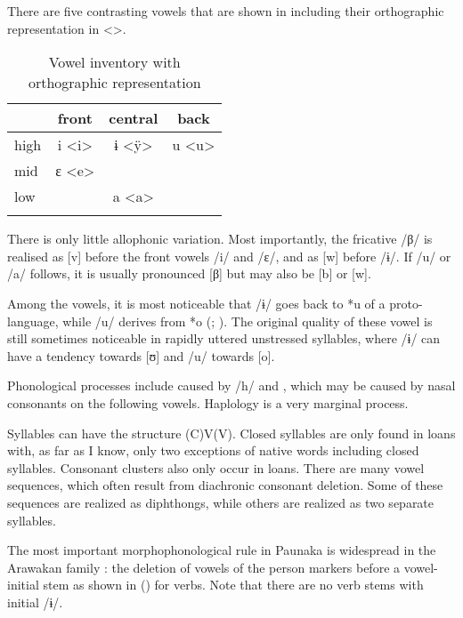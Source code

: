 There are five contrasting vowels that are shown in  including their orthographic representation in <>.

\begin{table}[htbp]
\caption{Vowel inventory with orthographic representation}

\begin{tabular}{lccc}
\lsptoprule
 & front & central & back \\
\midrule high & i <i> & ɨ <ÿ> & u <u> \\
 mid & ɛ <e> & & \\
 low & & a <a> & \\
\lspbottomrule
\end{tabular}

\label{table:O_vowels}
\end{table}%

There is only little allophonic variation. Most importantly, the fricative /β/ is realised as [v] before the front vowels /i/ and /ɛ/, and as [w] before /ɨ/. If /u/ or /a/ follows, it is usually pronounced [β] but may also be [b] or [w].

Among the vowels, it is most noticeable that /ɨ/ goes back to *u of a proto-language, while /u/ derives from *o (\citealt[]{deCarvalhoPAU}; \citealp[]{RamirezFranca2019}). The original quality of these vowel is still sometimes noticeable in rapidly uttered unstressed syllables, where /ɨ/ can have a tendency towards [ʊ] and /u/ towards [o].

Phonological processes include  caused by /h/ and , which may be caused by nasal consonants on the following vowels. Haplology is a very marginal process.

Syllables can have the structure (C)V(V). Closed syllables are only found in loans with, as far as I know, only two exceptions of native words including closed syllables. Consonant clusters also only occur in loans. There are many vowel sequences, which often result from diachronic consonant deletion. Some of these sequences are realized as diphthongs, while others are realized as two separate syllables.

The most important morphophonological rule in Paunaka is widespread in the Arawakan family \citep[cf.][385]{Payne1991}: the deletion of vowels of the person markers before a vowel-initial stem as shown in () for verbs. Note that there are no verb stems with initial /ɨ/.

